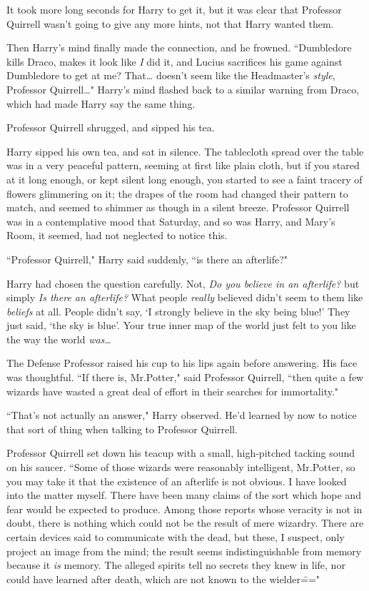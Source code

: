 It took more long seconds for Harry to get it, but it was clear that Professor Quirrell wasn't going to give any more hints, not that Harry wanted them.

Then Harry's mind finally made the connection, and he frowned. ``Dumbledore kills Draco, makes it look like \emph{I} did it, and Lucius sacrifices his game against Dumbledore to get at me? That{\ldots} doesn't seem like the Headmaster's \emph{style}, Professor Quirrell{\ldots}" Harry's mind flashed back to a similar warning from Draco, which had made Harry say the same thing.

Professor Quirrell shrugged, and sipped his tea.

Harry sipped his own tea, and sat in silence. The tablecloth spread over the table was in a very peaceful pattern, seeming at first like plain cloth, but if you stared at it long enough, or kept silent long enough, you started to see a faint tracery of flowers glimmering on it; the drapes of the room had changed their pattern to match, and seemed to shimmer as though in a silent breeze. Professor Quirrell was in a contemplative mood that Saturday, and so was Harry, and Mary's Room, it seemed, had not neglected to notice this.

``Professor Quirrell," Harry said suddenly, ``is there an afterlife?"

Harry had chosen the question carefully. Not, \emph{Do you believe in an afterlife?} but simply \emph{Is there an afterlife?} What people \emph{really} believed didn't seem to them like \emph{beliefs} at all. People didn't say, `I strongly believe in the sky being blue!' They just said, `the sky is blue'. Your true inner map of the world just felt to you like the way the world \emph{was{\ldots}}

The Defense Professor raised his cup to his lips again before answering. His face was thoughtful. ``If there is, Mr.\?Potter," said Professor Quirrell, ``then quite a few wizards have wasted a great deal of effort in their searches for immortality."

``That's not actually an answer," Harry observed. He'd learned by now to notice that sort of thing when talking to Professor Quirrell.

Professor Quirrell set down his teacup with a small, high-pitched tacking sound on his saucer. ``Some of those wizards were reasonably intelligent, Mr.\?Potter, so you may take it that the existence of an afterlife is not obvious. I have looked into the matter myself. There have been many claims of the sort which hope and fear would be expected to produce. Among those reports whose veracity is not in doubt, there is nothing which could not be the result of mere wizardry. There are certain devices said to communicate with the dead, but these, I suspect, only project an image from the mind; the result seems indistinguishable from memory because it \emph{is} memory. The alleged spirits tell no secrets they knew in life, nor could have learned after death, which are not known to the wielder\==="

